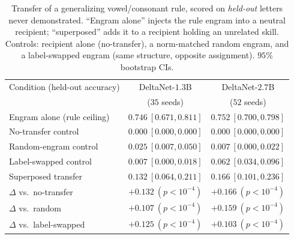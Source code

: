 \documentclass[11pt]{article}
\theoremstyle{definition}
\begin{document}
\begin{table}[h]
\centering
\caption{Transfer of a generalizing vowel/consonant rule, scored on \emph{held-out} letters never demonstrated. ``Engram alone'' injects the rule engram into a neutral recipient; ``superposed'' adds it to a recipient holding an unrelated skill. Controls: recipient alone (no-transfer), a norm-matched random engram, and a label-swapped engram (same structure, opposite assignment). $95\%$ bootstrap CIs.}
\label{tab:rule}
\begin{tabular}{lcc}
\toprule
Condition (held-out accuracy) & DeltaNet-$1.3$B & DeltaNet-$2.7$B \\
 & ($35$ seeds) & ($52$ seeds) \\
\midrule
Engram alone (rule ceiling) & $0.746\ [0.671,0.811]$ & $0.752\ [0.700,0.798]$ \\
\midrule
No-transfer control & $0.000\ [0.000,0.000]$ & $0.000\ [0.000,0.000]$ \\
Random-engram control & $0.025\ [0.007,0.050]$ & $0.007\ [0.000,0.022]$ \\
Label-swapped control & $0.007\ [0.000,0.018]$ & $0.062\ [0.034,0.096]$ \\
Superposed transfer & $0.132\ [0.064,0.211]$ & $0.166\ [0.101,0.236]$ \\
\midrule
$\Delta$ vs.\ no-transfer & $+0.132\ (p<10^{-4})$ & $+0.166\ (p<10^{-4})$ \\
$\Delta$ vs.\ random & $+0.107\ (p<10^{-4})$ & $+0.159\ (p<10^{-4})$ \\
$\Delta$ vs.\ label-swapped & $+0.125\ (p<10^{-4})$ & $+0.103\ (p<10^{-4})$ \\
\bottomrule
\end{tabular}
\end{table}
\end{document}

